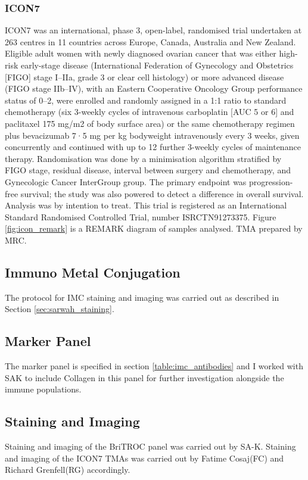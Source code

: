 \subsubsection{ICON7}
ICON7 was an international, phase 3, open-label, randomised trial undertaken at 263 centres in 11 countries across Europe, Canada, Australia and New Zealand. Eligible adult women with newly diagnosed ovarian cancer that was either high-risk early-stage disease (International Federation of Gynecology and Obstetrics [FIGO] stage I–IIa, grade 3 or clear cell histology) or more advanced disease (FIGO stage IIb–IV), with an Eastern Cooperative Oncology Group performance status of 0–2, were enrolled and randomly assigned in a 1:1 ratio to standard chemotherapy (six 3-weekly cycles of intravenous carboplatin [AUC 5 or 6] and paclitaxel 175 mg/m2 of body surface area) or the same chemotherapy regimen plus bevacizumab 7·5 mg per kg bodyweight intravenously every 3 weeks, given concurrently and continued with up to 12 further 3-weekly cycles of maintenance therapy. Randomisation was done by a minimisation algorithm stratified by FIGO stage, residual disease, interval between surgery and chemotherapy, and Gynecologic Cancer InterGroup group. The primary endpoint was progression-free survival; the study was also powered to detect a difference in overall survival. Analysis was by intention to treat. This trial is registered as an International Standard Randomised Controlled Trial, number ISRCTN91273375\cite{Perren2011Dec, BibEntry2020Jan}. Figure \ref{fig:icon_remark} is a REMARK diagram of samples analysed. TMA prepared by MRC.

\subsection{Immuno Metal Conjugation}
The protocol for IMC staining and imaging was carried out as described in Section \ref{sec:sarwah_staining}.

\subsection{Marker Panel}
The marker panel is specified in section \ref{table:imc_antibodies} and I worked with SAK to include Collagen in this panel for further investigation alongside the immune populations. 


\subsection{Staining and Imaging}
Staining and imaging of the BriTROC panel was carried out by SA-K. Staining and imaging of the ICON7 TMAs was carried out by Fatime Cosaj(FC) and Richard Grenfell(RG) accordingly.

